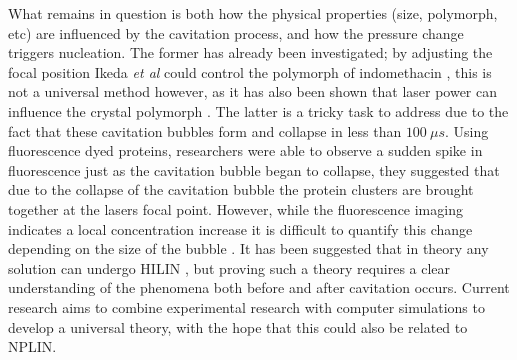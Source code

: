 What remains in question is both how the physical properties (size, 
polymorph, etc) are influenced by the cavitation process, and how 
the pressure change triggers nucleation. The former has already 
been investigated; by adjusting the focal position Ikeda \textit{et 
	al} could control the polymorph of indomethacin \cite{Ikeda2015}, 
this is not a universal method however, as it has also been shown 
that laser power can influence the crystal polymorph \cite{Wang2010}. 
The latter is a tricky task to address due to the fact that these 
cavitation bubbles form and collapse in less than $100\ \mu s$. 
Using fluorescence dyed proteins, researchers were able to observe 
a sudden spike in fluorescence just as the cavitation bubble began 
to collapse, they suggested that due to the collapse of the cavitation 
bubble the protein clusters are brought together at the lasers focal 
point. However, while the fluorescence imaging indicates a local 
concentration increase it is difficult to quantify this change 
depending on the size of the bubble \cite{Korede2023}. It has been 
suggested that in theory any solution can undergo HILIN 
\cite{Korede2023}, but proving such a theory requires a clear 
understanding of the phenomena both before and after cavitation occurs. 
Current research aims to combine experimental research with computer 
simulations to develop a universal theory, with the hope that this 
could also be related to NPLIN.   

